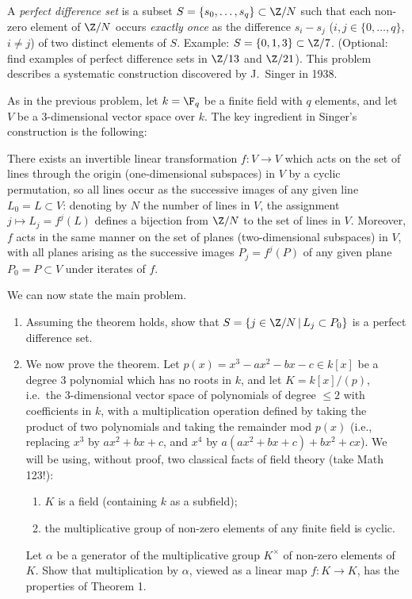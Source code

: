 A {\em perfect difference set} is a subset $S=\{s_0,\dots,s_q\}\subset \Z/N$  such that each non-zero element of $\Z/N$ occurs {\em exactly once} as the difference $s_i-s_j$ ($i,j\in \{0,\dots,q\}$, $i\neq j$) of two distinct elements of $S$. Example: $S=\{0,1,3\}\subset \Z/7$. (Optional: find examples of perfect difference sets in $\Z/13$ and $\Z/21$). This problem describes a systematic construction discovered by J.~Singer in 1938.

As in the previous problem, let $k=\F_q$ be a finite field with $q$ elements, and let $V$ be a 3-dimensional vector space over $k$. The key ingredient in Singer's construction is the following:

\begin{theorem}
There exists an invertible linear transformation $f:V\to V$ which acts on the set of lines through the origin (one-dimensional subspaces) in $V$ by a cyclic permutation, so all lines occur as the successive images of any given line $L_0=L\subset V$: denoting by $N$ the number of lines in $V$, the assignment $j\mapsto L_j=f^j(L)$ defines a bijection from $\Z/N$ to the set of lines in $V$. Moreover, $f$ acts in the same manner on the set of planes (two-dimensional subspaces) in $V$, with all planes arising as the successive images $P_j=f^j(P)$ of any given plane $P_0=P\subset V$ under iterates of $f$.
\end{theorem}

We can now state the main problem.

\begin{problem}
  \noindent
  \begin{enumerate}
    \item Assuming the theorem holds, show that $S=\{j\in \Z/N\,|\,L_j\subset P_0\}$ is a perfect difference set.
    \item We now prove the theorem. Let $p(x)=x^3-a x^2-b x-c\in k[x]$ be a degree 3 polynomial which has no roots in $k$, and let $K=k[x]/(p)$, i.e.\ the 3-dimensional vector space of polynomials of degree $\leq 2$ with coefficients in $k$, with a multiplication operation defined by taking the product of two polynomials and taking the remainder mod $p(x)$ (i.e., replacing $x^3$ by $ax^2+bx+c$, and $x^4$ by $a(ax^2+bx+c)+bx^2+cx$).
    We will be using, without proof, two classical facts of field theory
    (take Math 123!):
    \begin{enumerate}
      \item $K$ is a field (containing $k$ as a subfield);
      \item the multiplicative group of non-zero elements of any finite field is cyclic.
    \end{enumerate}
    Let $\alpha$ be a generator of the multiplicative group $K^\times$ of non-zero
    elements of $K$. Show that multiplication by $\alpha$, viewed as a linear
    map $f:K\to K$, has the properties of Theorem 1.
  \end{enumerate}
\end{problem}


